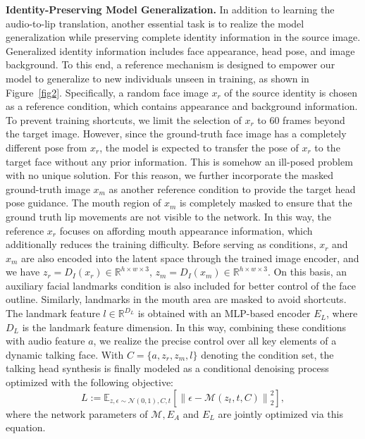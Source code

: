 \documentclass[10pt,twocolumn,letterpaper]{article}
\begin{document}
\vspace{1mm}
\textbf{Identity-Preserving Model Generalization.}
In addition to learning the audio-to-lip translation, another essential task is to realize the model generalization while preserving complete identity information in the source image. Generalized identity information includes face appearance, head pose, and image background. To this end, a reference mechanism is designed to empower our model to generalize to new individuals unseen in training, as shown in Figure~\ref{fig2}. Specifically, a random face image $x_r$ of the source identity is chosen as a reference condition, which contains appearance and background information. To prevent training shortcuts, we limit the selection of $x_r$ to 60 frames beyond the target image. However, since the ground-truth face image has a completely different pose from $x_r$, the model is expected to transfer the pose of $x_r$ to the target face without any prior information. This is somehow an ill-posed problem with no unique solution. For this reason, we further incorporate the masked ground-truth image $x_m$ as another reference condition to provide the target head pose guidance. The mouth region of $x_m$ is completely masked to ensure that the ground truth lip movements are not visible to the network. In this way, the reference $x_r$ focuses on affording mouth appearance information, which additionally reduces the training difficulty. Before serving as conditions, $x_r$ and $x_m$ are also encoded into the latent space through the trained image encoder, and we have $z_r = D_I (x_r)\in \mathbb{R}^{h\times w\times 3}$, $z_m = D_I (x_m)\in \mathbb{R}^{h\times w\times 3}$.
On this basis, an auxiliary facial landmarks condition is also included for better control of the face outline. Similarly, landmarks in the mouth area are masked to avoid shortcuts. The landmark feature $l\in \mathbb{R}^{D_L}$ is obtained with an MLP-based encoder $E_L$, where $D_L$ is the landmark feature dimension. In this way, combining these conditions with audio feature $a$, we realize the precise control over all key elements of a dynamic talking face. With $C=\{a, z_r, z_m, l\}$ denoting the condition set, the talking head synthesis is finally modeled as a conditional denoising process optimized with the following objective: 
\begin{equation}
L:=\mathbb{E}_{z, \epsilon \sim \mathcal{N}(0,1), C, t}\left[\left\|\epsilon-\mathcal{M}\left(z_{t}, t, C\right)\right\|_{2}^{2}\right],
\label{final_eq}
\end{equation}
where the network parameters of $\mathcal{M}, E_A$ and $E_L$ are jointly optimized via this equation.
\end{document}
